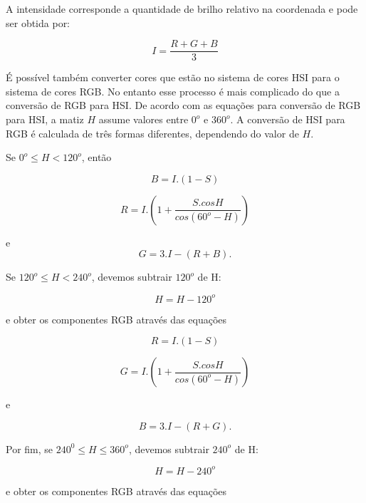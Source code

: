 \documentclass[	12pt, Times, openright, twoside, a4paper, english, brazil]{abntex2}
\begin{document}
A intensidade corresponde a quantidade de brilho relativo na coordenada e pode ser obtida por:

\begin{equation}
I = \frac{R+G+B}{3}
\end{equation}

É possível também converter cores que estão no sistema de cores HSI para o sistema de cores RGB. No entanto esse processo é mais complicado do que a conversão de RGB para HSI. De acordo com as equações para conversão de RGB para HSI, a matiz $H$ assume valores entre $0^o$ e $360^o$. A conversão de HSI para RGB é calculada de três formas diferentes, dependendo do valor de $H$. 

Se $0^o \leq H < 120^o$, então

\begin{equation}
B=I . (1-S)
\end{equation}

\begin{equation}
R=I  . \left( 1 +  \frac{S . cosH}{cos (60^o - H)} \right)
\end{equation}

 e
\begin{equation}
G=3 . I - (R+B).
\end{equation}

Se $120^o \leq H < 240^o$, devemos subtrair $120^o$ de H:

\begin{equation}
H=H-120^o
\end{equation}

e obter os componentes RGB através das equações

\begin{equation}
R=I . (1-S)
\end{equation}

\begin{equation}
G=I  . \left( 1 +  \frac{S . cosH}{cos (60^o - H)} \right)
\end{equation}

e

\begin{equation}
B=3 . I-(R+G).
\end{equation}

Por fim, se $240^0 \leq H \leq 360^o$, devemos subtrair $240^o$ de H:

\begin{equation}
H=H-240^o
\end{equation}

e obter os componentes RGB através das equações
\end{document}
